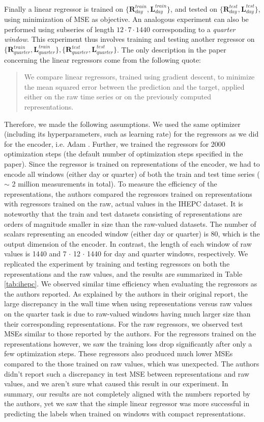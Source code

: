 \documentclass{article}
\begin{document}
Finally a linear regressor is trained on $\{\mathbf{R}_{day}^{train},\mathbf{L}_{day}^{train}\}$, and tested on $\{\mathbf{R}_{day}^{test},\mathbf{L}_{day}^{test}\}$, using minimization of MSE as objective. An analogous experiment can also be performed using subseries of length $12\cdot7\cdot1440$ corresponding to a \textit{quarter window}. This experiment thus involves training and testing another regressor on $\{\mathbf{R}_{quarter}^{train},\mathbf{L}_{quarter}^{train}\},\{\mathbf{R}_{quarter}^{test},\mathbf{L}_{quarter}^{test}\}$.
The only description in the paper concerning the linear regressors come from the following quote:
\begin{quote}
We compare linear regressors, trained using gradient descent, to minimize the mean squared error between the prediction and the target, applied either on the raw time series or on the previously computed representations.
\end{quote}
Therefore, we made the following assumptions. We used the same optimizer (including its hyperparameters, such as learning rate) for the regressors as we did for the encoder, i.e. Adam \citep{kingma2014adam}. Further, we trained the regressors for 2000 optimization steps (the default number of optimization steps specified in the paper). Since the regressor is trained on representations of the encoder, we had to encode all windows (either day or quarter) of both the train and test time series ($\sim$ 2 million measurements in total). To measure the efficiency of the representations, the authors compared the regressors trained on representations with regressors trained on the raw, actual values in the IHEPC dataset. It is noteworthy that the train and test datasets consisting of representations are orders of magnitude smaller in size than the raw-valued datasets. The number of scalars representing an encoded window (either day or quarter) is 80, which is the output dimension of the encoder. In contrast, the length of each window of raw values is 1440 and 7 $\cdot$ 12 $\cdot$ 1440 for day and quarter windows, respectively. We replicated the experiment by training and testing regressors on both the representations and the raw values, and the results are summarized in Table \ref{tab:ihepc}. We observed similar time efficiency when evaluating the regressors as the authors reported. As explained by the authors in their original report, the large discrepancy in the wall time when using representations versus raw values on the quarter task is due to raw-valued windows having much larger size than their corresponding representations. For the raw regressors, we observed test MSEs similar to those reported by the authors. For the regressors trained on the representations however, we saw the training loss drop significantly after only a few optimization steps. These regressors also produced much lower MSEs compared to the those trained on raw values, which was unexpected. The authors didn't report such a discrepancy in test MSE between representations and raw values, and we aren't sure what caused this result in our experiment. In summary, our results are not completely aligned with the numbers reported by the authors, yet we saw that the simple linear regressor was more successful in predicting the labels when trained on windows with compact representations.
\end{document}
